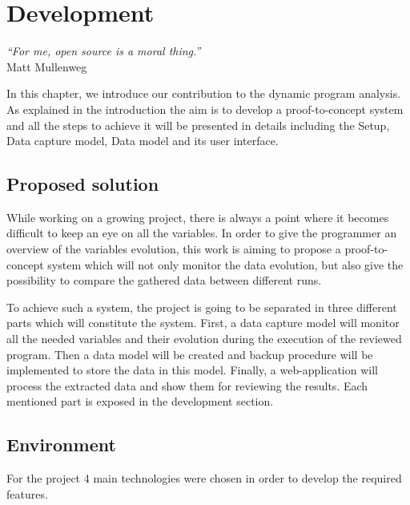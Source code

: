 

\chapter{Development} %
\label{chap:development}
\begin{flushright}
\textit{``For me, open source is a moral thing.''} \\ Matt Mullenweg
\end{flushright}

In this chapter, we introduce our contribution to the dynamic program analysis. As explained in the introduction the aim is to develop a proof-to-concept system and all the steps to achieve it will be presented in details including the Setup, Data capture model, Data model and its user interface.


\section{Proposed solution}
While working on a growing project, there is always a point where it becomes difficult to keep an eye on all the variables. In order to give the programmer an overview of the variables evolution, this work is aiming to propose a proof-to-concept system which will not only monitor the data evolution, but also give the possibility to compare the gathered data between different runs.

To achieve such a system, the project is going to be separated in three different parts which will constitute the system. First, a data capture model will monitor all the needed variables and their evolution during the execution of the reviewed program. Then a data model will be created and backup procedure will be implemented to store the data in this model. Finally, a web-application will process the extracted data and show them for reviewing the results. Each mentioned part is exposed in the development section.

\section{Environment}
For the project 4 main technologies were chosen in order to develop the required features. 

